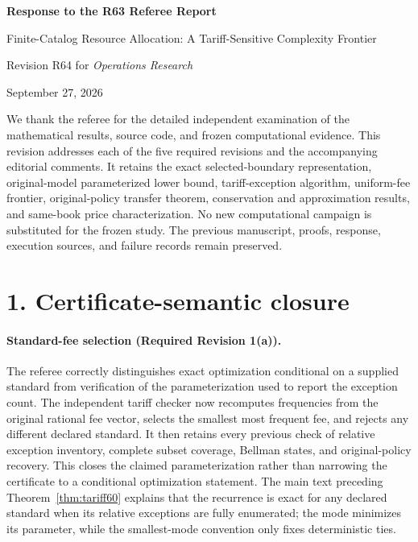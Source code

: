 \begin{center}{\Large\bfseries Response to the R63 Referee Report}\par\medskip
Finite-Catalog Resource Allocation: A Tariff-Sensitive Complexity Frontier\par
Revision R64 for \emph{Operations Research}\par September 27, 2026\end{center}

We thank the referee for the detailed independent examination of the mathematical results, source code, and frozen computational evidence. This revision addresses each of the five required revisions and the accompanying editorial comments. It retains the exact selected-boundary representation, original-model parameterized lower bound, tariff-exception algorithm, uniform-fee frontier, original-policy transfer theorem, conservation and approximation results, and same-book price characterization. No new computational campaign is substituted for the frozen study. The previous manuscript, proofs, response, execution sources, and failure records remain preserved.

\section*{1. Certificate-semantic closure}
\paragraph{Standard-fee selection (Required Revision 1(a)).}
The referee correctly distinguishes exact optimization conditional on a supplied standard from verification of the parameterization used to report the exception count. The independent tariff checker now recomputes frequencies from the original rational fee vector, selects the smallest most frequent fee, and rejects any different declared standard. It then retains every previous check of relative exception inventory, complete subset coverage, Bellman states, and original-policy recovery. This closes the claimed parameterization rather than narrowing the certificate to a conditional optimization statement. The main text preceding Theorem~\ref{thm:tariff60} explains that the recurrence is exact for any declared standard when its relative exceptions are fully enumerated; the mode minimizes its parameter, while the smallest-mode convention only fixes deterministic ties.

